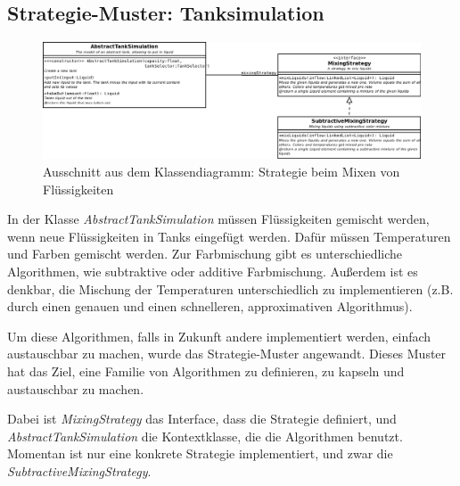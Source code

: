 \documentclass[parskip=full]{scrartcl}
\begin{document}
\subsection{Strategie-Muster: Tanksimulation}
\begin{figure}[H]
  \centering
  \includegraphics[scale=0.35]{design/pattern-screenshots/strategy-MixingStrategy.png}
  \caption{Ausschnitt aus dem Klassendiagramm: Strategie beim Mixen von Flüssigkeiten}
\end{figure}
In der Klasse \emph{AbstractTankSimulation} müssen Flüssigkeiten gemischt werden, wenn neue Flüssigkeiten in Tanks eingefügt werden.
Dafür müssen Temperaturen und Farben gemischt werden. Zur Farbmischung gibt es unterschiedliche Algorithmen, wie subtraktive oder additive
Farbmischung. Außerdem ist es denkbar, die Mischung der Temperaturen unterschiedlich zu implementieren (z.B. durch einen genauen und einen schnelleren,
approximativen Algorithmus).

Um diese Algorithmen, falls in Zukunft andere implementiert werden, einfach austauschbar zu machen, wurde
das Strategie-Muster angewandt. Dieses Muster hat das Ziel, eine Familie von Algorithmen zu definieren, zu kapseln und austauschbar zu machen.

Dabei ist \emph{MixingStrategy} das Interface, dass die Strategie definiert, und \emph{AbstractTankSimulation} die Kontextklasse, die die Algorithmen
benutzt. Momentan ist nur eine konkrete Strategie implementiert, und zwar die \emph{SubtractiveMixingStrategy}.

\pagebreak
\end{document}
